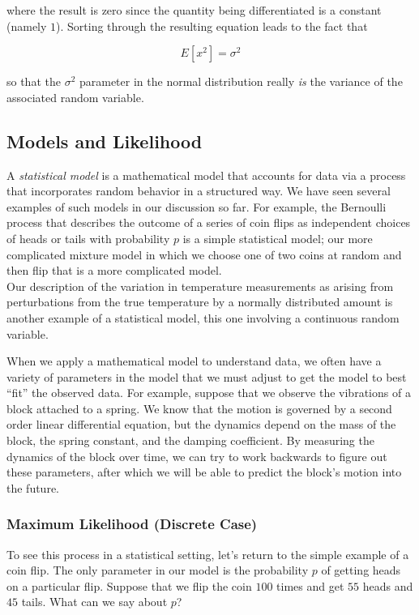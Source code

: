 \documentclass[
]{article}
\begin{document}
where the result is zero since the quantity being differentiated is a
constant (namely \(1\)). Sorting through the resulting equation leads to
the fact that

\[
E[x^2]=\sigma^2
\]

so that the \(\sigma^2\) parameter in the normal distribution really
\emph{is} the variance of the associated random variable.

\hypertarget{models-and-likelihood}{%
\subsection{Models and Likelihood}\label{models-and-likelihood}}

A \emph{statistical model} is a mathematical model that accounts for
data via a process that incorporates random behavior in a structured
way. We have seen several examples of such models in our discussion so
far. For example, the Bernoulli process that describes the outcome of a
series of coin flips as independent choices of heads or tails with
probability \(p\) is a simple statistical model; our more complicated
mixture model in which we choose one of two coins at random and then
flip that is a more complicated model.\\
Our description of the variation in temperature measurements as arising
from perturbations from the true temperature by a normally distributed
amount is another example of a statistical model, this one involving a
continuous random variable.

When we apply a mathematical model to understand data, we often have a
variety of parameters in the model that we must adjust to get the model
to best ``fit'' the observed data. For example, suppose that we observe
the vibrations of a block attached to a spring. We know that the motion
is governed by a second order linear differential equation, but the
dynamics depend on the mass of the block, the spring constant, and the
damping coefficient. By measuring the dynamics of the block over time,
we can try to work backwards to figure out these parameters, after which
we will be able to predict the block's motion into the future.

\hypertarget{sec:mlcoin}{%
\subsubsection{Maximum Likelihood (Discrete Case)}\label{sec:mlcoin}}

To see this process in a statistical setting, let's return to the simple
example of a coin flip. The only parameter in our model is the
probability \(p\) of getting heads on a particular flip. Suppose that we
flip the coin \(100\) times and get \(55\) heads and \(45\) tails. What
can we say about \(p\)?
\end{document}
